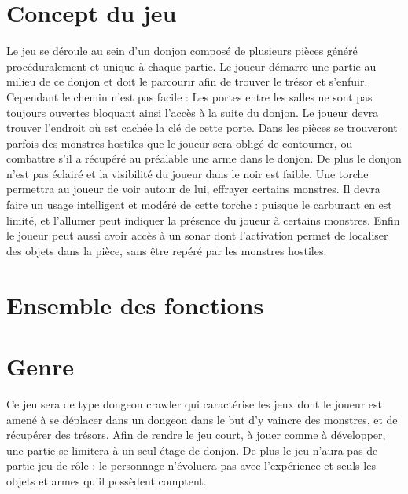\documentclass[a4paper, 11pt]{report}
\begin{document}
    \chapter{Concept du jeu}
      Le jeu se déroule au sein d'un donjon composé de plusieurs pièces généré procéduralement et unique à chaque partie.\newline
      Le joueur démarre une partie au milieu de ce donjon et doit le parcourir afin de trouver le trésor et s'enfuir.\newline
      Cependant le chemin n'est pas facile :\newline
      Les portes entre les salles ne sont pas toujours ouvertes bloquant ainsi l'accès à la suite du donjon.
      Le joueur devra trouver l'endroit où est cachée la clé de cette porte.\newline
      Dans les pièces se trouveront parfois des monstres hostiles que le joueur sera obligé de contourner, ou combattre
      s'il a récupéré au préalable une arme dans le donjon.\newline
      De plus le donjon n'est pas éclairé et la visibilité du joueur dans le noir est faible.
      Une torche permettra au joueur de voir autour de lui, effrayer certains monstres. Il devra faire un usage intelligent
      et modéré de cette torche : puisque le carburant en est limité, et l'allumer peut indiquer la présence du joueur
      à certains monstres.\newline
      Enfin le joueur peut aussi avoir accès à un sonar dont l'activation permet de localiser des objets dans la pièce,
      sans être repéré par les monstres hostiles.
	  
    \chapter{Ensemble des fonctions}

    \chapter{Genre}
      Ce jeu sera de type dongeon crawler qui caractérise les jeux dont le joueur est amené à se déplacer dans un dongeon dans le but
     d'y vaincre des monstres, et de récupérer des trésors.\newline
     Afin de rendre le jeu court, à jouer comme à développer, une partie se limitera à un seul étage de donjon.\newline
     De plus le jeu n'aura pas de partie jeu de rôle : le personnage n'évoluera pas avec l'expérience et seuls les objets et armes
     qu'il possèdent comptent.
\end{document}
